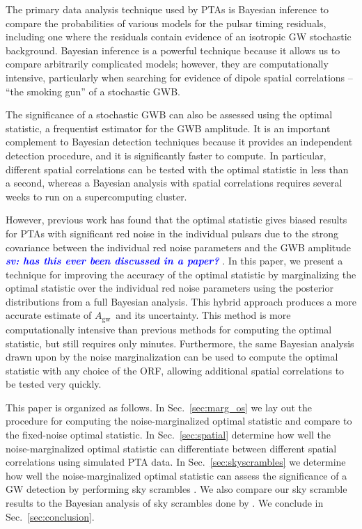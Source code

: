 \documentclass[twocolumn,aps,prd,superscriptaddress]{revtex4-1}
\newcommand{\sv}[1]{\textcolor{blue}{\it{\textbf{sv: #1}}} }
\newcommand{\Agw}{\ensuremath{A_\mathrm{gw}}}
\begin{document}
The primary data analysis technique used by PTAs is Bayesian inference 
to compare the probabilities of various models for the pulsar timing residuals, 
including one where the residuals contain evidence of an isotropic GW stochastic background. 
Bayesian inference is a powerful technique because it allows us to compare arbitrarily complicated 
models; however, they are computationally intensive, 
particularly when searching for evidence of dipole spatial correlations -- 
``the smoking gun'' of a stochastic GWB.

The significance of a stochastic GWB can also be assessed using the 
optimal statistic, a frequentist estimator for the GWB amplitude. 
It is an important complement to Bayesian detection techniques 
because it provides an independent detection procedure, 
and it is significantly faster to compute. 
In particular, different spatial correlations can be tested with the optimal statistic 
in less than a second, 
whereas a Bayesian analysis with spatial correlations requires 
several weeks to run on a supercomputing cluster.

However, previous work has found that the optimal statistic gives biased results 
for PTAs with significant red noise in the individual pulsars due to the 
strong covariance between the individual red noise parameters 
and the GWB amplitude \sv{has this ever been discussed in a paper?}. 
In this paper, we present a technique for improving the accuracy of the optimal statistic 
by marginalizing the optimal statistic over the individual red noise parameters 
using the posterior distributions from a full Bayesian analysis. 
This hybrid approach produces a more accurate 
estimate of \Agw\ and its uncertainty. 
This method is more computationally intensive than previous methods 
for computing the optimal statistic, but still requires only minutes. 
Furthermore, the same Bayesian analysis drawn upon by the noise marginalization 
can be used to compute the optimal statistic with any choice of the ORF, 
allowing additional spatial correlations to be tested very quickly.

This paper is organized as follows. In Sec.~\ref{sec:marg_os} 
we lay out the procedure for computing the noise-marginalized optimal statistic 
and compare to the fixed-noise optimal statistic. 
In Sec.~\ref{sec:spatial} determine how well 
the noise-marginalized optimal statistic can 
differentiate between different spatial correlations 
using simulated PTA data. 
In Sec.~\ref{sec:skyscrambles} we determine how well the noise-marginalized optimal statistic 
can assess the significance of a GW detection by performing sky scrambles \citep{cs2016}. 
We also compare our sky scramble results to the Bayesian analysis of sky scrambles done by \citet{tlb+2017}. 
We conclude in Sec.~\ref{sec:conclusion}.
\end{document}
